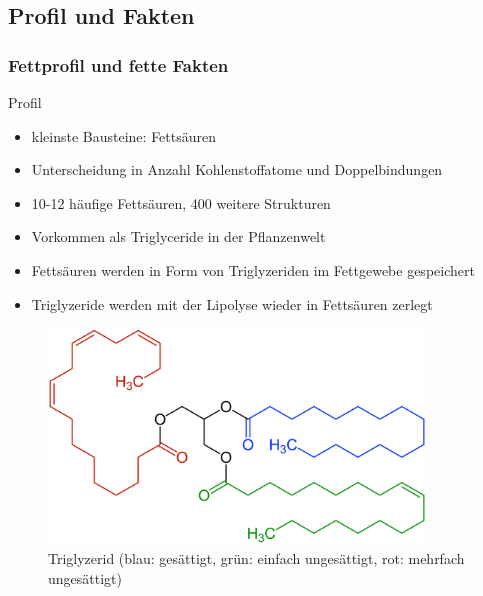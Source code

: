 \documentclass[xcolor=dvipsnames]{beamer}
\begin{document}
    \subsection{Profil und Fakten}
    \begin{frame}[allowframebreaks]
        \frametitle{Fettprofil und fette Fakten}
        \begin{block}{Profil}
            \begin{itemize}
                \setlength\itemsep{1em}
                \item kleinste Bausteine: Fettsäuren
                \item Unterscheidung in Anzahl Kohlenstoffatome und Doppelbindungen
                \item 10-12 häufige Fettsäuren, 400 weitere Strukturen
                \item Vorkommen als Triglyceride in der Pflanzenwelt
                \item Fettsäuren werden in Form von Triglyzeriden im Fettgewebe gespeichert
                \item Triglyzeride werden mit der Lipolyse wieder in Fettsäuren zerlegt
            \end{itemize}
        \end{block}

        \framebreak

        \begin{figure}
            \centering
            \includegraphics[width=10cm]{../images/Triglyzerid.png}
            \caption{Triglyzerid (blau: gesättigt, grün: einfach ungesättigt, rot: mehrfach ungesättigt)}
        \end{figure}

        \framebreak


\end{frame}
\end{document}

